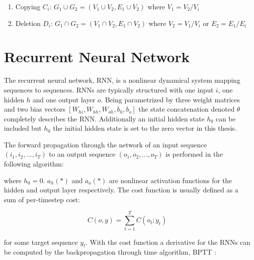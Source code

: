 \begin{enumerate}
    \item Copying $C_i$: $G_1 \cup G_2 = (V_1 \cup V_2, E_1 \cup V_2)$ where $V_1 = V_2 / V_i$ 
    \item Deletion $D_i $: $G_1 \cap G_2 = (V_1 \cap V_2, E_1 \cap V_2)$ where $V_2 = V_1 / V_i$ or $E_2 = E_1 / E_i$
\end{enumerate}

\section{Recurrent Neural Network}

The recurrent neural network, RNN, is a nonlinear dynamical system mapping sequences to sequences. RNNs are typically structured with one input $i$, one hidden $h$ and one output layer $o$. Being parametrized by three weight matrices and two bias vectors \([W_{hi}, W_{hh}, W_{oh}, b_h, b_o]\) the state concatenation denoted \(\theta\) completely describes the RNN. Additionally an initial hidden state $h_0$ can be included but $h_0$ the initial hidden state is set to the zero vector in this thesis.

The forward propagation through the network of an input sequence \((i_1, i_2, ... , i_T)\) to an output sequence \((o_1, o_2, ..., o_T) \) is performed in the following algorithm:

\begin{algorithmic}[1]
    \EndFor
\end{algorithmic}

where $h_0 = 0$. $a_h(*)$ and $a_o(*)$ are nonlinear activation functions for the hidden and output layer respectively. The cost function is usually defined as a sum of per-timestep cost:

\[C(o, y) = \sum_{t=1}^{T}C(o_t; y_t)\]

for some target sequence $y_t$. With the cost function a derivative for the RNNs can be computed by the backpropagation through time algorithm, BPTT \cite{RNN1}:

\begin{algorithmic}[1]
    \EndFor
    \State {}
\end{algorithmic}

